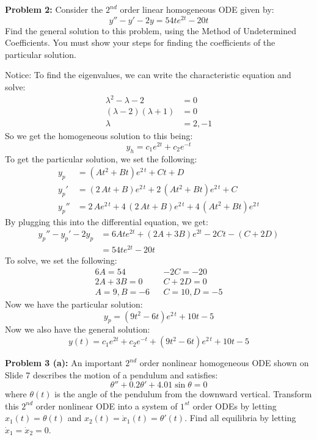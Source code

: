 \documentclass[12pt]{article}
\begin{document}
\newpage 

\noindent \textbf{Problem 2: }Consider the $2^{nd}$ order linear homogeneous ODE given by:
	$$
	y'' - y' - 2y = 54te^{2t} - 20t
	$$
Find the general solution to this problem, using the Method of Undetermined Coefficients. You must show your steps for finding the coefficients of the particular solution.

\vspace{\baselineskip}

\noindent Notice: To find the eigenvalues, we can write the characteristic equation and solve:
	\begin{align*}
		\lambda^2 - \lambda - 2 &= 0 \\
		(\lambda - 2)(\lambda + 1) &= 0 \\
		\lambda &= 2, -1
	\end{align*}
So we get the homogeneous solution to this being:
	$$
	y_h = c_1e^{2t} + c_2e^{-t}
	$$
To get the particular solution, we set the following:
	\begin{align*}
		y_p &=  \left( A{t}^{2}+Bt \right) {{e}^{2\,t}}+Ct+D \\
		y_p' &=  \left( 2\,At+B \right) {{e}^{2\,t}}+2\, \left( A{t}^{2}+Bt \right) {{e}^{2\,t}}+C \\
		y_p'' &= 2\,A{{e}^{2\,t}}+4\, \left( 2\,At+B \right) {{e}^{2\,t}}+4\,\left( A{t}^{2}+Bt \right) {{e}^{2\,t}}	
	\end{align*}
By plugging this into the differential equation, we get:
	\begin{align*}
		y_p'' - y_p' - 2y_p &= 6Ate^{2t} + (2A + 3B)e^{2t} - 2Ct - (C + 2D) \\
		&= 54te^{2t} - 20t
	\end{align*}
To solve, we set the following:
	\begin{align*}
		6A = 54 && -2C = -20 \\
		2A + 3B = 0 && C + 2D = 0 \\
		A = 9, B = -6 && C = 10,  D = -5
	\end{align*}
Now we have the particular solution:
	$$
	y_p = \left( 9{t}^{2}-6t \right) {{e}^{2\,t}}+10t-5 
	$$
Now we also have the general solution:
	$$
	y(t) = c_1e^{2t} + c_2e^{-t} + \left( 9{t}^{2}-6t \right) {{e}^{2\,t}}+10t-5
	$$
	
\newpage

\noindent \textbf{Problem 3 (a): }An important $2^{nd}$ order nonlinear homogeneous ODE shown on Slide 7 describes the motion of a pendulum and satisfies:
	$$
	\theta'' + 0.2\theta' + 4.01\sin\theta = 0
	$$
where $\theta(t)$ is the angle of the pendulum from the downward vertical. Transform this $2^{nd}$ order nonlinear ODE into a system of $1^{st}$ order ODEs by letting $x_1(t) = \theta(t)$ and $x_2(t) = \dot{x}_1(t) = \theta'(t)$. Find all equilibria by letting $\dot{x}_1 = \dot{x}_2 = 0$. 
\end{document}
